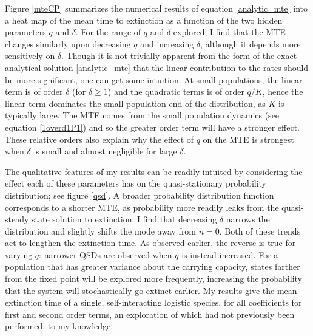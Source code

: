 Figure \ref{mteCP} summarizes the numerical results of equation \ref{analytic_mte} into a heat map of the mean time to extinction as a function of the two hidden parameters $q$ and $\delta$.
For the range of $q$ and $\delta$ explored, I find that the MTE changes similarly upon decreasing $q$ and increasing $\delta$, although it depends more sensitively on $\delta$. 
Though it is not trivially apparent from the form of the exact analytical solution \ref{analytic_mte} that the linear contribution to the rates should be more significant, one can get some intuition. %
At small populations, the linear term is of order $\delta$ (for $\delta \geq 1$) and the quadratic terms is of order $q/K$, hence the linear term dominates the small population end of the distribution, as $K$ is typically large. 
The MTE comes from the small population dynamics (see equation \ref{1overd1P1}) and so the greater order term will have a stronger effect. 
These relative orders also explain why the effect of $q$ on the MTE is strongest when $\delta$ is small and almost negligible for large $\delta$. 

The qualitative features of my results can be readily intuited by considering the effect each of these parameters has on the quasi-stationary probability distribution; see figure \ref{qsd}. 
A broader probability distribution function corresponds to a shorter MTE, as probability more readily leaks from the quasi-steady state solution to extinction.
I find that decreasing $\delta$ narrows the distribution and slightly shifts the mode away from $n=0$. 
Both of these trends act to lengthen the extinction time. 
As observed earlier, the reverse is true for varying $q$: narrower QSDs are observed when $q$ is instead increased.
For a population that has greater variance about the carrying capacity, states farther from the fixed point will be explored more frequently, increasing the probability that the system will stochastically go extinct earlier. 
My results give the mean extinction time of a single, self-interacting logistic species, for all coefficients for first and second order terms, an exploration of which had not previously been performed, to my knowledge. 

